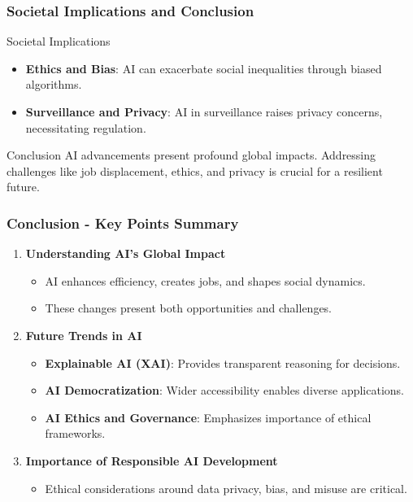 \documentclass[aspectratio=169]{beamer}
\begin{document}
\begin{frame}[fragile]
    \frametitle{Societal Implications and Conclusion}
    \begin{block}{Societal Implications}
        \begin{itemize}
            \item \textbf{Ethics and Bias}: AI can exacerbate social inequalities through biased algorithms.
            \item \textbf{Surveillance and Privacy}: AI in surveillance raises privacy concerns, necessitating regulation.
        \end{itemize}
    \end{block}

    \begin{block}{Conclusion}
        AI advancements present profound global impacts. Addressing challenges like job displacement, ethics, and privacy is crucial for a resilient future.
    \end{block}
\end{frame}

\begin{frame}[fragile]
    \frametitle{Conclusion - Key Points Summary}
    \begin{enumerate}
        \item \textbf{Understanding AI's Global Impact} 
        \begin{itemize}
            \item AI enhances efficiency, creates jobs, and shapes social dynamics.
            \item These changes present both opportunities and challenges.
        \end{itemize}
        
        \item \textbf{Future Trends in AI} 
        \begin{itemize}
            \item \textbf{Explainable AI (XAI)}: Provides transparent reasoning for decisions.
            \item \textbf{AI Democratization}: Wider accessibility enables diverse applications.
            \item \textbf{AI Ethics and Governance}: Emphasizes importance of ethical frameworks.
        \end{itemize}
        
        \item \textbf{Importance of Responsible AI Development}
        \begin{itemize}
            \item Ethical considerations around data privacy, bias, and misuse are critical.
        \end{itemize}
    \end{enumerate}
\end{frame}
\end{document}
